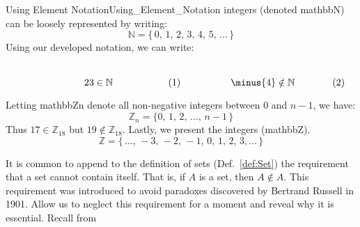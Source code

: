 \begin{fexample}{Using Element Notation}{Using_Element_Notation}
        integers (denoted \gls{mathbbN}) can be loosely represented by writing:
        \begin{equation}
            \label{eqn:Natural_Numbers_Ellipses}%
            \mathbb{N}=\big\{\,0,\,1,\,2,\,3,\,4,\,5,\,\dots\,\big\}
        \end{equation}
        Using our developed notation, we can write:
        \par
        \begin{subequations}
            \begin{minipage}[b]{0.49\textwidth}
                \centering
                \begin{equation}
                    23\in\mathbb{N}
                \end{equation}
            \end{minipage}
            \hfill
            \begin{minipage}[b]{0.49\textwidth}
                \centering
                \begin{equation}
                    \minus{4}\notin\mathbb{N}
                \end{equation}
            \end{minipage}
        \end{subequations}
        \par\vspace{2.5ex}
        Letting \gls{mathbbZn} denote all non-negative integers between 0 and
        $n-1$, we have:
        \begin{equation}
            \label{eqn:Z_n_Ellipses}%
            \mathbb{Z}_{n}=\big\{0,\,1,\,2,\,\dots,\,n-1\,\big\}
        \end{equation}
        Thus $17\in\mathbb{Z}_{18}$ but $19\notin\mathbb{Z}_{18}$. Lastly, we
        present the integers (\gls{mathbbZ}).
        \begin{equation}
            \label{eqn:Integers_Ellipses}%
            \mathbb{Z}=\big\{\,\dots,\,\minus{3},\,\minus{2},\,\minus{1},
                             \,0,\,1,\,2,\,3,\dots\,\big\}
        \end{equation}
    \end{fexample}
    It is common to append to the definition of sets (Def.~\ref{def:Set}) the
    requirement that a set cannot contain itself. That is, if $A$ is a set, then
    $A\notin{A}$. This requirement was introduced to avoid paradoxes discovered
    by Bertrand Russell in 1901. Allow us to neglect
    this requirement for a moment and reveal why it is essential. Recall from
